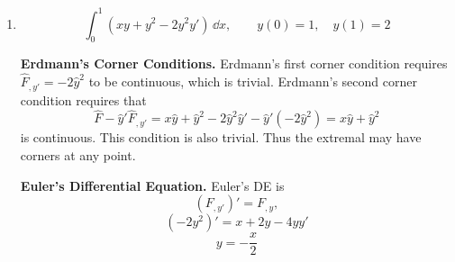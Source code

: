 \begin{Solution}
\begin{enumerate}
    \begin{center}
    \end{center}
  \item
    \[
    \int_0^1 (x y + y^2 - 2 y^2 y') \,\dd x, \qquad
    y(0) = 1, \quad
    y(1) = 2
    \]



    \textbf{Erdmann's Corner Conditions.}
    Erdmann's first corner condition requires $\hat{F}_{,y'} = -2 \hat{y}^2$
    to be continuous, which is trivial.  Erdmann's second corner condition
    requires that
    \[
    \hat{F} - \hat{y}' \hat{F}_{,y'} 
    = x \hat{y} + \hat{y}^2 - 2 \hat{y}^2 \hat{y}' - \hat{y}' (-2 \hat{y}^2)
    = x \hat{y} + \hat{y}^2
    \]
    is continuous.  This condition is also trivial.  Thus the extremal may 
    have corners at any point.


    \textbf{Euler's Differential Equation.}
    Euler's DE is
    \[
    (F_{,y'})' = F_{,y},
    \]
    \[
    (-2 y^2 )' = x + 2y -4 y y'
    \]
    \[
    y = -\frac{x}{2}
    \]

    \begin{center}
    \end{center}
  \end{enumerate}
\end{Solution}



